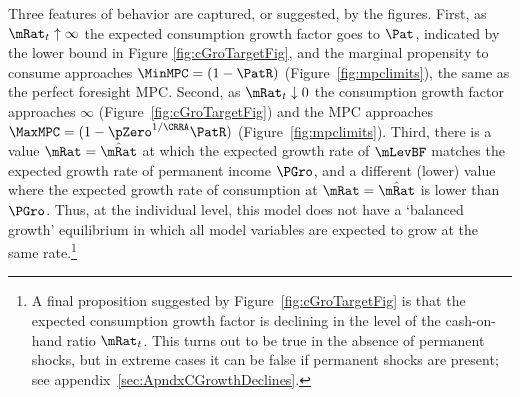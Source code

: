 \documentclass[BufferStockTheory]{subfiles}
\begin{document}
Three features of behavior are captured, or suggested, by the
figures. First, as $\mRat_{t} \uparrow \infty$ the expected
consumption growth factor goes to ${\Pat}$, indicated by the lower
bound in Figure \ref{fig:cGroTargetFig}, and the marginal propensity
to consume approaches $\MinMPC=(1-\PatR)$
(Figure~\ref{fig:mpclimits}), the same as the perfect foresight MPC.  Second, as $\mRat_t \downarrow 0$ the consumption
growth factor approaches $\infty$ (Figure~\ref{fig:cGroTargetFig}) and
the MPC approaches $\MaxMPC=(1-\pZero^{1/\CRRA}\PatR)$ (Figure~\ref{fig:mpclimits}).  Third,
there is a value $\mRat = \hat{\mRat}$ at which the expected growth rate of $\mLevBF$ matches the expected growth rate of permanent income $\PGro$, and a different (lower) value where the expected growth rate of consumption at $\mRat = \hat{\mRat}$ is lower than $\PGro$.  Thus, at the individual level, this model does not have a `balanced growth' equilibrium in which all model variables are expected to grow at the same rate.\footnote{A final proposition suggested by
Figure~\ref{fig:cGroTargetFig} is that the expected consumption growth
factor is declining in the level of the cash-on-hand ratio
$\mRat_{t}$.  This turns out to be true in the absence of permanent
shocks, but in extreme cases it can be false if permanent shocks are
present; see appendix~\ref{sec:ApndxCGrowthDeclines}.}
\begin{comment}
Third (Figure \ref{fig:cGroTargetFig}), there are two special values of $\mRat$, which
we will call the `individual balanced growth' point $\mStE$ because it is the point where expected consumption growth and expected permanent income growth are balanced, and the `individual target' $\mTrg$  such that if $\mRat_t = \mTrg$ then $\Ex_t [{\mRat}_{t+1}] = \mRat_t$.  %
of permanent noncapital income.  (The individual consumer does not expect `balanced growth' at $\mTrg$).  

The final proposition suggested by
Figure~\ref{fig:cGroTargetFig} is that the expected consumption growth
factor is declining in the level of the cash-on-hand ratio
$\mRat_{t}$.  This turns out to be true in the absence of permanent
shocks, but in extreme cases it can be false if permanent shocks are
present.\footnote{Throughout the remaining analysis I make a final
  assumption that is not strictly justified by the foregoing.  We have
  seen that the finite-horizon consumption functions
  $\usual{\cFunc}_{T-n}(\mRat)$ are twice continuously differentiable and
  strictly concave, and that they converge to a continuous function
  $\usual{\cFunc}(\mRat)$.  It does not strictly follow that the limiting
  function $\usual{\cFunc}(\mRat)$ is twice continuously differentiable, but I
  will assume that it is.}
\end{comment}
\end{document}

